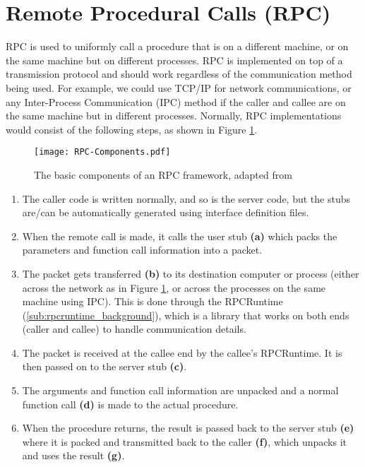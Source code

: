 \section{Remote Procedural Calls (RPC)} %
\label{sec:rpc_background}

RPC is used to uniformly call a procedure that is on a different machine, or on the same machine but on different processes. RPC is implemented on top of a transmission protocol and should work regardless of the communication method being used. For example, we could use TCP/IP for network communications, or any Inter-Process Communication (IPC) method if the caller and callee are on the same machine but in different processes. Normally, RPC implementations would consist of the following steps, as shown in Figure \ref{fig:rpc-components}.

\begin{figure}
    \centering
    \texttt{[image: RPC-Components.pdf]} 
    \caption{The basic components of an RPC framework, adapted from \cite{birrell1984implementing}}
    \label{fig:rpc-components}
\end{figure}

\begin{enumerate}
  \item The caller code is written normally, and so is the server code, but the stubs are/can be automatically generated using interface definition files.
  \item When the remote call is made, it calls the user stub \textbf{(a)} which packs the parameters and function call information into a packet.
  \item The packet gets transferred \textbf{(b)} to its destination computer or process (either across the network as in Figure \ref{fig:rpc-components}, or across the processes on the same machine using IPC). This is done through the RPCRuntime (\ref{sub:rpcruntime_background}), which is a library that works on both ends (caller and callee) to handle communication details.
  \item The packet is received at the callee end by the callee's RPCRuntime. It is then passed on to the server stub \textbf{(c)}.
  \item The arguments and function call information are unpacked and a normal function call \textbf{(d)} is made to the actual procedure.
  \item When the procedure returns, the result is passed back to the server stub \textbf{(e)} where it is packed and transmitted back to the caller \textbf{(f)}, which unpacks it and uses the result \textbf{(g)}.
\end{enumerate}


